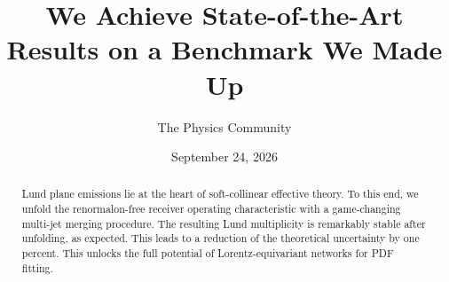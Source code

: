 \documentclass[11pt]{article}
\title{We Achieve State-of-the-Art Results on a Benchmark We Made Up}
\author{The Physics Community}
\date{September 24, 2026}
\numberwithin{equation}{section}
\theoremstyle{definition}
\theoremstyle{remark}
\begin{document}
\maketitle
\begin{abstract}
Lund plane emissions lie at the heart of soft-collinear effective
theory. To this end, we unfold the renormalon-free receiver operating
characteristic with a game-changing multi-jet merging procedure. The
resulting Lund multiplicity is remarkably stable after unfolding, as
expected. This leads to a reduction of the theoretical uncertainty by
one percent. This unlocks the full potential of Lorentz-equivariant
networks for PDF fitting.
\end{abstract}
\tableofcontents




\nocite{*}


\end{document}
